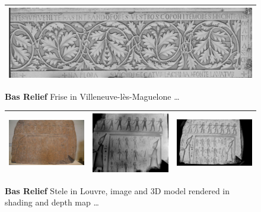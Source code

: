 \begin{figure}
\begin{tabular}{||c|c|c|c||}
   \multicolumn{4}{|c|}{\vspace{2mm} \includegraphics[width=160mm]{FIGS/SAMPLES/FrisScaledShade.jpg}} \\ \hline  \hline
\end{tabular}
\caption{{\bf Bas Relief} Frise in Villeneuve-lès-Maguelone \dots}
\end{figure}


\begin{figure}
\begin{tabular}{||c|c|c||}
   \hline \hline 
   \includegraphics[width=52mm]{FIGS/SAMPLES/Hiero1_2908.JPG} &
   \includegraphics[width=52mm]{FIGS/SAMPLES/Hiero2_2908.JPG} &
   \includegraphics[width=52mm]{FIGS/SAMPLES/Hiero3_2908.JPG} \\ \hline  \hline 
\end{tabular}
\caption{{\bf Bas Relief} Stele in Louvre, image and 3D model rendered in shading and depth map \dots}
\end{figure}



